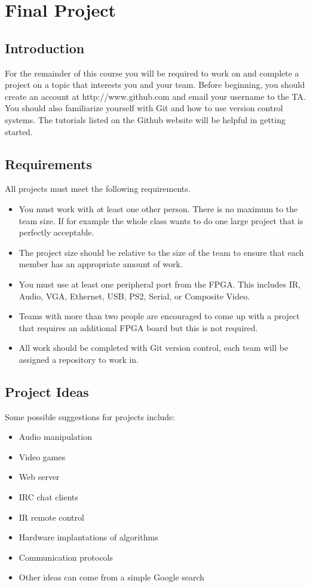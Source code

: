 \section{Final Project}

\subsection{Introduction}

For the remainder of this course you will be required to work on and complete a project on a topic that interests you and your team. Before beginning, you should create an account at http://www.github.com and email your username to the TA. You should also familiarize yourself with Git and how to use version control systems. The tutorials listed on the Github website will be helpful in getting started.

\subsection{Requirements}
All projects must meet the following requirements.
\begin{itemize}
	\item You must work with {\emph at least} one other person. There is no maximum to the team size. If for example the whole class wants to do one large project that is perfectly acceptable.
	\item The project size should be relative to the size of the team to ensure that each member has an appropriate amount of work.
	\item You must use at least one peripheral port from the FPGA. This includes IR, Audio, VGA, Ethernet, USB, PS2, Serial, or Composite Video. 
	\item Teams with more than two people are encouraged to come up with a project that requires an additional FPGA board but this is not required. 
	\item All work should be completed with Git version control, each team will be assigned a repository to work in. 
\end{itemize}

\subsection{Project Ideas}
Some possible suggestions for projects include:

\begin{itemize}
	\item Audio manipulation
	\item Video games
	\item Web server
	\item IRC chat clients
	\item IR remote control
	\item Hardware implantations of algorithms
	\item Communication protocols
	\item Other ideas can come from a simple Google search
\end{itemize}


